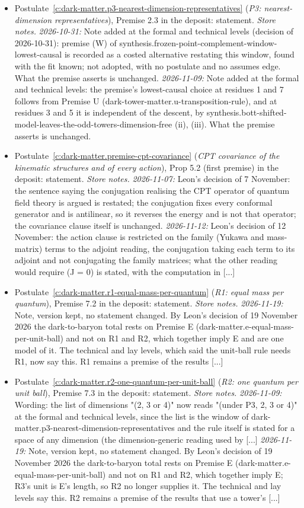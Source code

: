 \documentclass[11pt]{article}
\theoremstyle{definition}
\theoremstyle{plain}
\begin{document}
\begin{itemize}
\item Postulate~\ref{c:dark-matter.p3-nearest-dimension-representatives} (\emph{P3: nearest-dimension representatives}), Premise 2.3 in the deposit: statement. \emph{Store notes.} \emph{2026-10-31:} Note added at the formal and technical levels (decision of 2026-10-31): premise (W) of synthesis.frozen-point-complement-window-lowest-causal is recorded as a costed alternative restating this window, found with the fit known; not adopted, with no postulate and no assumes edge. What the premise asserts is unchanged. \emph{2026-11-09:} Note added at the formal and technical levels: the premise's lowest-causal choice at residues 1 and 7 follows from Premise U (dark-tower-matter.u-transposition-rule), and at residues 3 and 5 it is independent of the descent, by synthesis.bott-shifted-model-leaves-the-odd-towers-dimension-free (ii), (iii). What the premise asserts is unchanged.
\item Postulate~\ref{c:dark-matter.premise-cpt-covariance} (\emph{CPT covariance of the kinematic structures and of every action}), Prop 5.2 (first premise) in the deposit: statement. \emph{Store notes.} \emph{2026-11-07:} Leon's decision of 7 November: the sentence saying the conjugation realising the CPT operator of quantum field theory is argued is restated; the conjugation fixes every conformal generator and is antilinear, so it reverses the energy and is not that operator; the covariance clause itself is unchanged. \emph{2026-11-12:} Leon's decision of 12 November: the action clause is restricted on the family (Yukawa and mass-matrix) terms to the adjoint reading, the conjugation taking each term to its adjoint and not conjugating the family matrices; what the other reading would require (J = 0) is stated, with the computation in [...]
\item Postulate~\ref{c:dark-matter.r1-equal-mass-per-quantum} (\emph{R1: equal mass per quantum}), Premise 7.2 in the deposit: statement. \emph{Store notes.} \emph{2026-11-19:} Note, version kept, no statement changed. By Leon's decision of 19 November 2026 the dark-to-baryon total rests on Premise E (dark-matter.e-equal-mass-per-unit-ball) and not on R1 and R2, which together imply E and are one model of it. The technical and lay levels, which said the unit-ball rule needs R1, now say this. R1 remains a premise of the results [...]
\item Postulate~\ref{c:dark-matter.r2-one-quantum-per-unit-ball} (\emph{R2: one quantum per unit ball}), Premise 7.3 in the deposit: statement. \emph{Store notes.} \emph{2026-11-09:} Wording: the list of dimensions "(2, 3 or 4)" now reads "(under P3, 2, 3 or 4)" at the formal and technical levels, since the list is the window of dark-matter.p3-nearest-dimension-representatives and the rule itself is stated for a space of any dimension (the dimension-generic reading used by [...] \emph{2026-11-19:} Note, version kept, no statement changed. By Leon's decision of 19 November 2026 the dark-to-baryon total rests on Premise E (dark-matter.e-equal-mass-per-unit-ball) and not on R1 and R2, which together imply E; R3's unit is E's length, so R2 no longer supplies it. The technical and lay levels say this. R2 remains a premise of the results that use a tower's [...]

\end{itemize}
\end{document}
